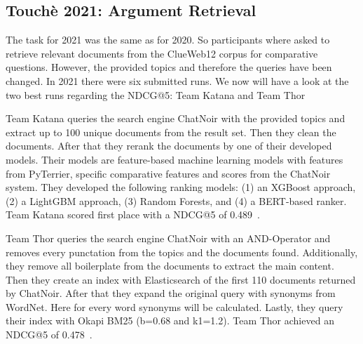     \subsection{Touchè 2021: Argument Retrieval}
        The task for 2021 was the same as for 2020. So participants where asked to retrieve relevant documents from the ClueWeb12 corpus for comparative questions. However, the provided topics and therefore the queries have been changed. In 2021 there were six submitted runs. We now will have a look at the two best runs regarding the NDCG@5: Team Katana and Team Thor~\cite{BondarenkoFBGAPBSWPH2021}\par
        Team Katana queries the search engine ChatNoir with the provided topics and extract up to 100 unique documents from the result set. Then they clean the documents. After that they rerank the documents by one of their developed models. Their models are feature-based machine learning models with features from PyTerrier, specific comparative features and scores from the ChatNoir system. They developed the following ranking models: (1) an XGBoost approach, (2) a LightGBM approach, (3) Random Forests, and (4) a BERT-based
        ranker. Team Katana scored first place with a NDCG@5 of 0.489~\cite{ChekalinaP2021}.\par
        Team Thor queries the search engine ChatNoir with an AND-Operator and removes every punctation from the topics and the documents found. Additionally, they remove all boilerplate from the documents to extract the main content. Then they create an index with Elasticsearch of the first 110 documents returned by ChatNoir. After that they expand the original query with synonyms from WordNet. Here for every word synonyms will be calculated. Lastly, they query their index with Okapi BM25 (b=0.68 and k1=1.2). Team Thor achieved an NDCG@5 of 0.478~\cite{ShirshakovaW2021}. 

